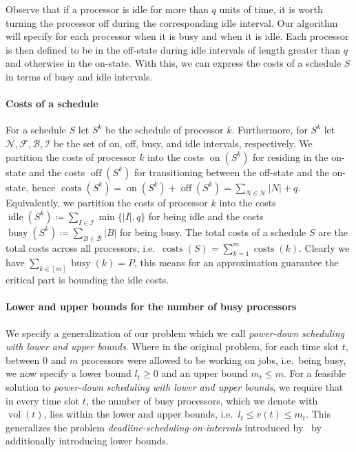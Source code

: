 \documentclass[a4paper]{article}
\DeclareMathOperator{\on}{on}
\DeclareMathOperator{\off}{off}
\DeclareMathOperator{\idle}{idle}
\DeclareMathOperator{\busy}{busy}
\DeclareMathOperator{\costs}{costs}
\DeclareMathOperator{\vol}{vol}
\begin{document}
Observe that if a processor is idle for more than $q$ units of time, it is worth turning the processor off during the corresponding idle interval.
Our algorithm will specify for each processor when it is busy and when it is idle.
Each processor is then defined to be in the off-state during idle intervals of length greater than $q$ and otherwise in the on-state.
With this, we can express the costs of a schedule $S$ in terms of busy and idle intervals.

\paragraph{Costs of a schedule}
For a schedule $S$ let $S^k$ be the schedule of processor $k$.
Furthermore, for $S^k$ let $\mathcal{N}, \mathcal{F}, \mathcal{B}, \mathcal{I}$ be the set of on, off, busy, and idle intervals, respectively.
We partition the costs of processor $k$ into the costs $\on(S^k)$ for residing in the on-state and the costs $\off(S^k)$ for transitioning between the off-state and the on-state, hence $\costs(S^k) = \on(S^k) + \off(S^k) = \sum_{N \in \mathcal{N}} |N| + q$.
Equivalently, we partition the costs of processor $k$ into the costs $\idle(S^k) \coloneqq \sum_{I \in \mathcal{I}} \min \{ |I|, q \}$ for being idle and the costs $\busy(S^k) \coloneqq \sum_{B \in \mathcal{B}} |B|$ for being busy.
The total costs of a schedule $S$ are the total costs across all processors, i.e.\ $\costs(S) = \sum_{k = 1}^{m} \costs(k)$.
Clearly we have $\sum_{k \in [m]} \busy(k) = P$, this means for an approximation guarantee the critical part is bounding the idle costs.

\paragraph{Lower and upper bounds for the number of busy processors}
We specify a generalization of our problem which we call \emph{power-down scheduling with lower and upper bounds}.
Where in the original problem, for each time slot $t$, between $0$ and $m$ processors were allowed to be working on jobs, i.e.\ being busy, we now specify a lower bound $l_t \geq 0$ and an upper bound $m_t \leq m$.
For a feasible solution to \emph{power-down scheduling with lower and upper bounds}, we require that in every time slot $t$, the number of busy processors, which we denote with $\vol(t)$, lies within the lower and upper bounds, i.e.\ $l_t \leq v(t) \leq m_t$.
This generalizes the problem \emph{deadline-scheduling-on-intervals} introduced by~\cite{antoniadis} by additionally introducing lower bounds.
\end{document}

